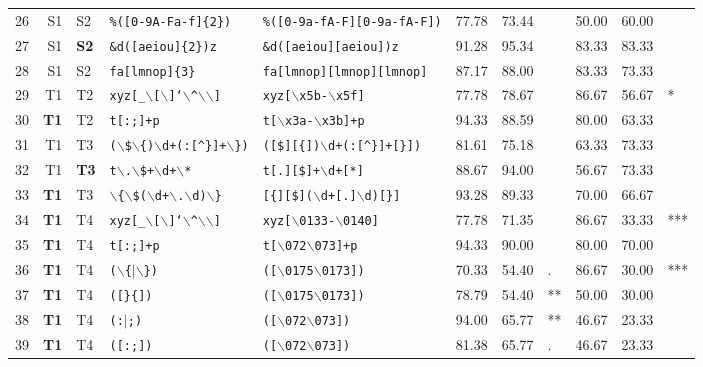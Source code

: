 \begin{table*}[ht]
\begin{tabular}{p{0.3cm}r@{ -- }lp{4cm}p{4cm}|p{0.8cm}p{0.8cm}p{0.6cm}|p{0.99cm}p{0.99cm}p{0.6cm}}
  26 & S1 & S2 & {\tt \%([0-9A-Fa-f]\{2\})} & {\tt \%([0-9a-fA-F][0-9a-fA-F])} & 77.78 & 73.44 &   & 50.00 & 60.00 &   \\ 
  27 & S1 & {\bf S2} & {\tt \&d([aeiou]\{2\})z} & {\tt \&d([aeiou][aeiou])z} & 91.28 & 95.34 &   & 83.33 & 83.33 &   \\ 
  28 & S1 & S2 & {\tt fa[lmnop]\{3\}} & {\tt fa[lmnop][lmnop][lmnop]} & 87.17 & 88.00 &   & 83.33 & 73.33 &   \\ 
  \hline
  
  29 & T1 & T2 & {\tt xyz[\_$\backslash$[$\backslash$]`$\backslash$\verb|^|$\backslash$$\backslash$]} & {\tt xyz[$\backslash$x5b-$\backslash$x5f]} & 77.78 & 78.67 &   & 86.67 & 56.67 & * \\ 
  30 & {\bf T1} & T2 & {\tt t[:;]+p} & {\tt t[$\backslash$x3a-$\backslash$x3b]+p} & 94.33 & 88.59 &   & 80.00 & 63.33 &   \\ 
  
  31 & T1 & T3 & {\tt ($\backslash$\$$\backslash$\{)$\backslash$d+(:[\verb|^|\}]+$\backslash$\})} & {\tt ([\$][\{])$\backslash$d+(:[\verb|^|\}]+[\}])} & 81.61 & 75.18 &   & 63.33 & 73.33 &   \\ 
  32 & T1 & {\bf T3} & {\tt t$\backslash$.$\backslash$\$+$\backslash$d+$\backslash$*} & {\tt t[.][\$]+$\backslash$d+[*]} & 88.67 & 94.00 &   & 56.67 & 73.33 &   \\ 
  33 & {\bf T1} & T3 & {\tt $\backslash$\{$\backslash$\$($\backslash$d+$\backslash$.$\backslash$d)$\backslash$\}} & {\tt [\{][\$]($\backslash$d+[.]$\backslash$d)[\}]} & 93.28 & 89.33 &   & 70.00 & 66.67 &   \\ 
  
  34 & {\bf T1} & T4 & {\tt xyz[\_$\backslash$[$\backslash$]`$\backslash$\verb|^|$\backslash$$\backslash$]} & {\tt xyz[$\backslash$0133-$\backslash$0140]} & 77.78 & 71.35 &   & 86.67 & 33.33 & *** \\ 

  35 & {\bf T1} & T4 & {\tt t[:;]+p} & {\tt t[$\backslash$072$\backslash$073]+p} & 94.33 & 90.00 &   & 80.00 & 70.00 &   \\ 
  
  36 & {\bf T1} & T4 & {\tt ($\backslash$\{$|$$\backslash$\})} & {\tt ([$\backslash$0175$\backslash$0173])} & 70.33 & 54.40 & . & 86.67 & 30.00 & *** \\ 
  37 & {\bf T1} & T4 & {\tt ([\}\{])} & {\tt ([$\backslash$0175$\backslash$0173])} & 78.79 & 54.40 & ** & 50.00 & 30.00 &   \\ 
  38 & {\bf T1} & T4 & {\tt (:$|$;)} & {\tt ([$\backslash$072$\backslash$073])} & 94.00 & 65.77 & ** & 46.67 & 23.33 &   \\ 
  39 & {\bf T1} & T4 & {\tt ([:;])} & {\tt ([$\backslash$072$\backslash$073])} & 81.38 & 65.77 & . & 46.67 & 23.33 &   \\ 
  

\end{tabular}
\end{table*}
